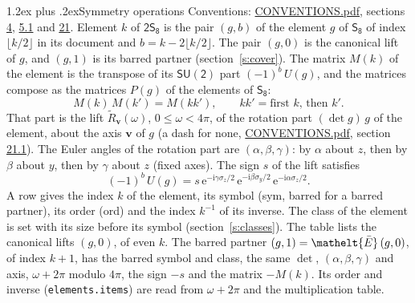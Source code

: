 \documentclass[10pt,a4paper]{article}
\makeatletter
\renewcommand\section{\@startsection{section}{1}{\z@}{-3ex plus -1ex minus -.2ex}%
  {1.2ex plus .2ex}{\normalfont\large\sffamily\bfseries\color{parttitle}}}
\numberwithin{equation}{section}
\newcommand{\eltfont}[1]{{\let\sigma\eltsigma\mathelt{#1}}}
\newcommand{\grp}[1]{\mathsf{#1}}
\newcommand{\elt}[1]{\eltfont{#1}}
\newcommand{\vv}{\mathbf{v}}
\newcommand{\iunit}{\mathrm{i}}
\newcommand{\expe}{\mathrm{e}}
\newcommand{\barred}[1]{\bar{#1}}
\newcommand{\lift}[1]{\tilde{#1}}
\newcommand{\pauli}[1]{\sigma_{#1}}
\makeatother
\begin{document}
\section{Symmetry operations}\label{s:elements}
Conventions: \href{../../CONVENTIONS.pdf}{CONVENTIONS.pdf}, sections \href{../../../rotation/CONVENTIONS.pdf\#conv.4}{4}, \href{../../../rotation/CONVENTIONS.pdf\#conv.5.1}{5.1} and \href{../../CONVENTIONS.pdf\#conv.21}{21}.
\leavevmode\label{n:index.element}\label{n:element.g}Element $k$ of $\grp{2S_{8}}$ is the pair $(g, b)$ of the element $g$ of \href{../../../rotation/data/pdf/S8.pdf}{$\grp{S_{8}}$} of index $\lfloor k/2\rfloor$ in its document and $b = k - 2\lfloor k/2\rfloor$. The pair $(g, 0)$ is the canonical lift of $g$, and $(g, 1)$ is its barred partner (section~\ref{s:cover}). \label{n:matrix.element.pin}\label{n:matrix.element}The matrix $M(k)$ of the element is the transpose of its $\grp{SU(2)}$ part $(-1)^{b}\,U(g)$, and the matrices compose as the matrices $P(g)$ of the elements of $\grp{S_{8}}$:
\begin{equation}\label{e:mprod}M(k)\,M(k') = M(kk'),\qquad kk' = \text{first } k\text{, then } k'.\end{equation}
\leavevmode\label{n:angle.omega}\label{n:vector.axis}\label{n:vector.pole}That part is the lift $\lift{R}_{\vv}(\omega)$, $0 \le \omega < 4\pi$, of the rotation part $(\det g)\,g$ of the element, about the axis $\vv$ of $g$ (a dash for none, \href{../../CONVENTIONS.pdf}{CONVENTIONS.pdf}, section \href{../../CONVENTIONS.pdf\#conv.21.1}{21.1}). \label{n:angle.euler.alpha}\label{n:angle.euler.beta}\label{n:angle.euler.gamma}\label{n:vector.coordinates}The Euler angles of the rotation part are $(\alpha,\beta,\gamma)$: by $\alpha$ about $z$, then by $\beta$ about $y$, then by $\gamma$ about $z$ (fixed axes). \label{n:local.euler.sign}The sign $s$ of the lift satisfies
\begin{equation}\label{e:euler}(-1)^{b}\,U(g) = s\,\expe^{-\iunit\gamma\pauli{z}/2}\,\expe^{-\iunit\beta\pauli{y}/2}\,\expe^{-\iunit\alpha\pauli{z}/2}.\end{equation}
\leavevmode\label{n:index.element.inverse}\label{n:head.sym}\label{n:head.ord}A row gives the index $k$ of the element, its symbol (sym, barred for a barred partner), its order (ord) and the index $k^{-1}$ of its inverse. \label{n:head.class}The class of the element is set with its size before its symbol (section~\ref{s:classes}).
The table lists the canonical lifts $(g, 0)$, of even $k$. The barred partner $(g, 1) = \elt{\barred{E}}\,(g, 0)$, of index $k + 1$, has the barred symbol and class, the same $\det$, $(\alpha,\beta,\gamma)$ and axis, $\omega + 2\pi$ modulo $4\pi$, the sign $-s$ and the matrix $-M(k)$. Its order and inverse (\texttt{elements.items}) are read from $\omega + 2\pi$ and the multiplication table.
\end{document}
